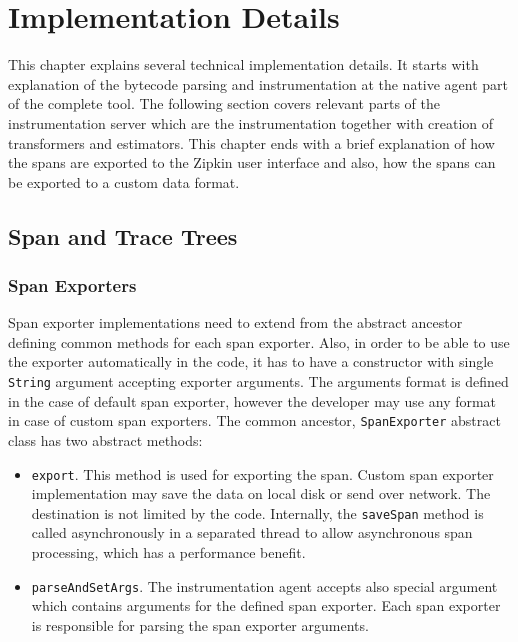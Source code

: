 \chapter{Implementation Details}
\label{chap:implementation}
This chapter explains several technical implementation details. It starts with explanation of the bytecode parsing and instrumentation at the native agent part of the complete tool. The following section covers relevant parts of the instrumentation server which are the instrumentation together with creation of transformers and estimators. This chapter ends with a brief explanation of how the spans are exported to the Zipkin user interface and also, how the spans can be exported to a custom data format.
\section{Span and Trace Trees}

\subsection{Span Exporters}
\label{imp:exporter}
Span exporter implementations need to extend from the abstract ancestor defining common methods for each span exporter. Also, in order to be able to use the exporter automatically in the code, it has to have a constructor with single \texttt{String} argument accepting exporter arguments. The arguments format is defined in the case of default span exporter, however the developer may use any format in case of custom span exporters. The common ancestor, \texttt{SpanExporter} abstract class has two abstract methods:
\begin{itemize}
	\item \texttt{export}. This method is used for exporting the span. Custom span exporter implementation may save the data on local disk or send over network. The destination is not limited by the code. Internally, the \texttt{saveSpan} method is called asynchronously in a separated thread to allow asynchronous span processing, which has a performance benefit.
	\item \texttt{parseAndSetArgs}. The instrumentation agent accepts also special argument which contains arguments for the defined span exporter. Each span exporter is responsible for parsing the span exporter arguments.
\end{itemize}

